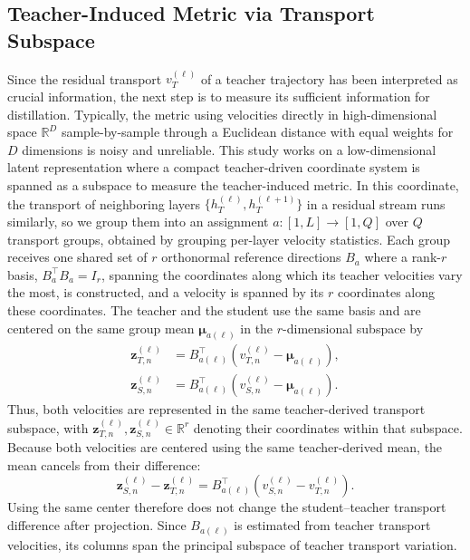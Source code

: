 \documentclass[letterpaper]{article} %
\newcommand{\R}{\mathbb{R}}
\newcommand{\bz}{\boldsymbol{z}}
\newcommand{\bmu}{\boldsymbol{\mu}}      %
\newcommand{\bB}{B}
\theoremstyle{plain}
\theoremstyle{definition}
\begin{document}
\subsection{Teacher-Induced Metric via Transport Subspace}
\label{sec:subspace}
Since the residual transport $v_T^{(\ell)}$ of a teacher trajectory has been interpreted as crucial information, the next step is to measure its sufficient information for distillation. Typically, the metric using velocities directly in high-dimensional space $\R^D$ sample-by-sample through a Euclidean distance with equal weights for $D$ dimensions is noisy and unreliable. This study works on a low-dimensional latent representation where a compact teacher-driven coordinate system is spanned as a subspace to measure the teacher-induced metric. In this coordinate, the transport of neighboring layers $\{h_T^{(\ell)}, h_T^{(\ell+1)}\}$ in a residual stream runs similarly, so we group them into an assignment $a:[1,L]\to[1,Q]$ over $Q$ {transport groups}, obtained by grouping per-layer velocity statistics. Each group receives one shared set of $r$ orthonormal reference directions $\bB_a$ where a rank-$r$ basis, $\bB_a^{\top}\bB_a=I_r$, spanning the coordinates along which its teacher velocities vary the most, is constructed, and a velocity is spanned by its $r$ coordinates along these coordinates. The teacher and the student use the {same} basis and are centered on the same group mean $\bmu_{a(\ell)}$ in the $r$-dimensional subspace by
\begin{equation}
\begin{aligned}
  \bz_{T,n}^{(\ell)}
  &=
  \bB_{a(\ell)}^{\top}
  \left(
    v_{T,n}^{(\ell)}
    -
    \bmu_{a(\ell)}
  \right),
  \\
  \bz_{S,n}^{(\ell)}
  &=
  \bB_{a(\ell)}^{\top}
  \left(
    v_{S,n}^{(\ell)}
    -
    \bmu_{a(\ell)}
  \right).
\end{aligned}
\label{eq:proj}
\end{equation}
Thus, both velocities are represented in the same teacher-derived transport subspace, with
$\bz_{T,n}^{(\ell)},\bz_{S,n}^{(\ell)}\in\R^r$
denoting their coordinates within that subspace. Because both velocities are centered using the same teacher-derived mean, the mean cancels from their difference:
\begin{equation}
  \bz_{S,n}^{(\ell)}
  -
  \bz_{T,n}^{(\ell)}
  =
  \bB_{a(\ell)}^{\top}
  \left(
    v_{S,n}^{(\ell)}
    -
    v_{T,n}^{(\ell)}
  \right).
  \label{eq:projected-difference}
\end{equation}
Using the same center therefore does not change the student--teacher transport difference after projection. Since $\bB_{a(\ell)}$ is estimated from teacher transport velocities, its columns span the principal subspace of teacher transport variation.
\end{document}
